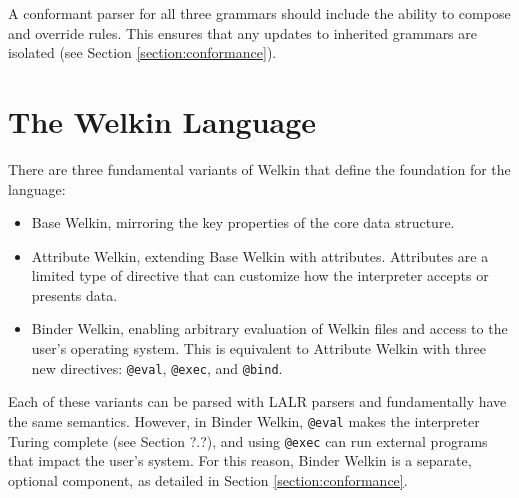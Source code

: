 

A conformant parser for all three grammars should include the ability to compose and override rules. This ensures that any updates to inherited grammars are isolated (see Section \ref{section:conformance}).
%
\section{The Welkin Language}

There are three fundamental variants of Welkin that define the foundation for the language:
\begin{itemize}
	\item Base Welkin, mirroring the key properties of the core data structure.
	\item Attribute Welkin, extending Base Welkin with attributes. Attributes are a limited type of directive that can customize how the interpreter accepts or presents data.
	\item Binder Welkin, enabling arbitrary evaluation of Welkin files and access to the user's operating system. This is equivalent to Attribute Welkin with three new directives: \texttt{@eval}, \texttt{@exec}, and \texttt{@bind}. \end{itemize}
Each of these variants can be parsed with LALR parsers and fundamentally have the same semantics. However, in Binder Welkin, \texttt{@eval} makes the interpreter Turing complete (see Section ?.?), and using \texttt{@exec} can run external programs that impact the user's system. For this reason, Binder Welkin is a separate, optional component, as detailed in Section \ref{section:conformance}.

